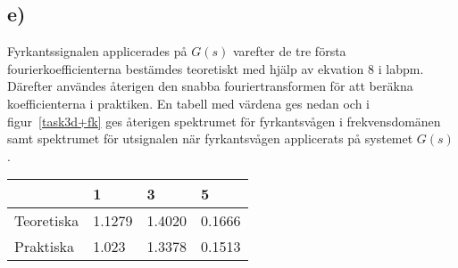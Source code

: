 \subsection*{e)}
Fyrkantssignalen applicerades på $G(s)$ varefter de tre första
fourierkoefficienterna bestämdes teoretiskt med hjälp av ekvation 8 i labpm.
Därefter användes återigen den snabba fouriertransformen för att beräkna
koefficienterna i praktiken. En tabell med värdena ges nedan och i
figur~\ref{task3d+fk} ges återigen spektrumet för fyrkantsvågen i
frekvensdomänen samt spektrumet för utsignalen när fyrkantsvågen applicerats på
systemet $G(s)$.

\begin{tabular}{| l | l | l | l |}
    \hline
     & 1 & 3 & 5 \\ \hline
    Teoretiska & 1.1279 & 1.4020 & 0.1666 \\ \hline
    Praktiska & 1.023 & 1.3378 & 0.1513 \\ \hline
\end{tabular}

